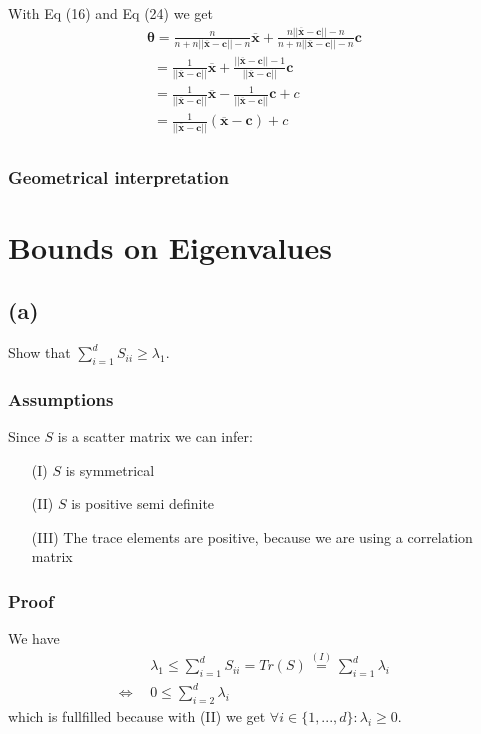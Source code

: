 \documentclass{article}
\begin{document}
With Eq (16) and Eq (24) we get
\begin{align*}
&\boldsymbol{\theta}= \frac{n}{n + n ||\boldsymbol{\overline{x}} - \boldsymbol{c} || - n }\boldsymbol{\overline{x}} + \frac{n ||\boldsymbol{\overline{x}} - \boldsymbol{c} || - n}{n + n ||\boldsymbol{\overline{x}} - \boldsymbol{c} || - n}  \boldsymbol{c}&&\\
&~~= \frac{1}{||\boldsymbol{\overline{x}} - \boldsymbol{c} ||}\boldsymbol{\overline{x}} + \frac{||\boldsymbol{\overline{x}} - \boldsymbol{c} || - 1}{||\boldsymbol{\overline{x}} - \boldsymbol{c} ||}  \boldsymbol{c}&&\\
&~~= \frac{1}{||\boldsymbol{\overline{x}} - \boldsymbol{c} ||}\boldsymbol{\overline{x}}  - \frac{1}{||\boldsymbol{\overline{x}} - \boldsymbol{c} ||}  \boldsymbol{c} + c&&\\
&~~= \frac{1}{||\boldsymbol{\overline{x}} - \boldsymbol{c} ||}(\boldsymbol{\overline{x}}  - \boldsymbol{c}) + c&&\\
\end{align*}
\subsubsection*{Geometrical interpretation}


\section{Bounds on Eigenvalues }
\subsection*{(a)}
Show that $\sum \limits _{i=1}^d S_{ii} \geq \lambda_1$.
\subsubsection*{Assumptions}
Since $S$ is a scatter matrix we can infer:
\begin{itemize}
	\item[(I)] $S$ is symmetrical 
	\item[(II)] $S$ is positive semi definite
	\item[(III)] The trace elements are positive, because we are using a correlation matrix
\end{itemize}
\subsubsection*{Proof}
We have
\begin{align*}
&\lambda_1 \leq \sum \limits _{i=1}^d S_{ii} = Tr(S) \stackrel{(I)}{=}
\sum \limits _{i=1}^d \lambda_i& \\
\Leftrightarrow~~& 0 \leq  \sum \limits _{i=2}^d \lambda_i&
\end{align*}
which is fullfilled because with (II) we get $\forall i \in \{1,...,d\} : \lambda_i \geq 0$.
\end{document}
